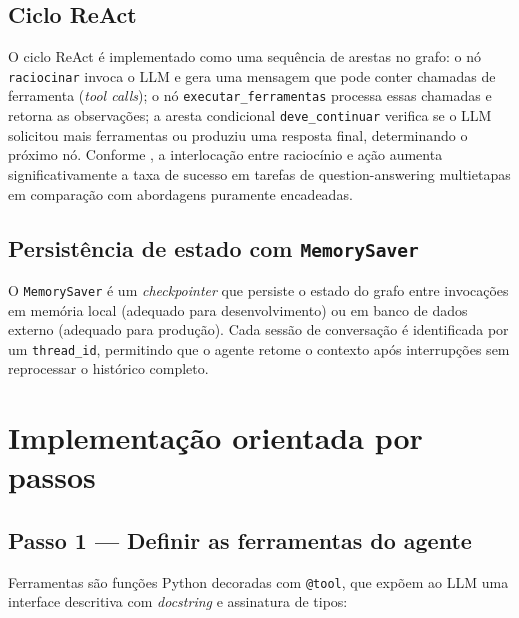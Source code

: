 \subsection{Ciclo ReAct}

O ciclo ReAct \'e implementado como uma sequ\^encia de arestas no
grafo: o n\'o \texttt{raciocinar} invoca o LLM e gera uma mensagem
que pode conter chamadas de ferramenta (\textit{tool calls}); o n\'o
\texttt{executar\_ferramentas} processa essas chamadas e retorna as
observa\c{c}\~oes; a aresta condicional \texttt{deve\_continuar}
verifica se o LLM solicitou mais ferramentas ou produziu uma resposta
final, determinando o pr\'oximo n\'o. Conforme
, a interloca\c{c}\~ao entre racioc\'inio e
a\c{c}\~ao aumenta significativamente a taxa de sucesso em tarefas
de question-answering multietapas em compara\c{c}\~ao com abordagens
puramente encadeadas.

\subsection{Persist\^encia de estado com \texttt{MemorySaver}}

O \texttt{MemorySaver} \'e um \textit{checkpointer} que persiste o
estado do grafo entre invoca\c{c}\~oes em mem\'oria local (adequado
para desenvolvimento) ou em banco de dados externo (adequado para
produ\c{c}\~ao). Cada sess\~ao de conversa\c{c}\~ao \'e identificada por
um \texttt{thread\_id}, permitindo que o agente retome o contexto
ap\'os interrup\c{c}\~oes sem reprocessar o hist\'orico completo.

\section{Implementa\c{c}\~ao orientada por passos}

\subsection{Passo 1 --- Definir as ferramentas do agente}

Ferramentas s\~ao fun\c{c}\~oes Python decoradas com
\texttt{@tool}, que exp\~oem ao LLM uma interface descritiva com
\textit{docstring} e assinatura de tipos:

